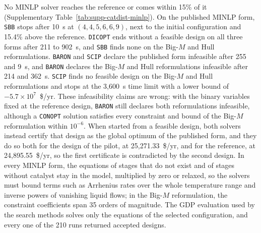 \documentclass{article}
\begin{document}
No MINLP solver reaches the reference or comes within 15\% of it (Supplementary Table~\ref{tab:supp-catdist-minlp}).
On the published MINLP form, \texttt{SBB} stops after 10~s at \((4,4,5,6,6,9)\), next to the initial configuration and 15.4\% above the reference.
\texttt{DICOPT} ends without a feasible design on all three forms after 211 to 902~s, and \texttt{SBB} finds none on the Big-\(M\) and Hull reformulations.
\texttt{BARON} and \texttt{SCIP} declare the published form infeasible after 255 and 9~s, and \texttt{BARON} declares the Big-\(M\) and Hull reformulations infeasible after 214 and 362~s.
\texttt{SCIP} finds no feasible design on the Big-\(M\) and Hull reformulations and stops at the 3,600~s time limit with a lower bound of \(-5.7\times10^{7}\)~\$/yr.
These infeasibility claims are wrong: with the binary variables fixed at the reference design, \texttt{BARON} still declares both reformulations infeasible, although a \texttt{CONOPT} solution satisfies every constraint and bound of the Big-\(M\) reformulation within \(10^{-6}\).
When started from a feasible design, both solvers instead certify that design as the global optimum of the published form, and they do so both for the design of the pilot, at 25,271.33~\$/yr, and for the reference, at 24,895.55~\$/yr, so the first certificate is contradicted by the second design.
In every MINLP form, the equations of stages that do not exist and of stages without catalyst stay in the model, multiplied by zero or relaxed, so the solvers must bound terms such as Arrhenius rates over the whole temperature range and inverse powers of vanishing liquid flows; in the Big-\(M\) reformulation, the constraint coefficients span 35 orders of magnitude.
The GDP evaluation used by the search methods solves only the equations of the selected configuration, and every one of the 210 runs returned accepted designs.
\end{document}
